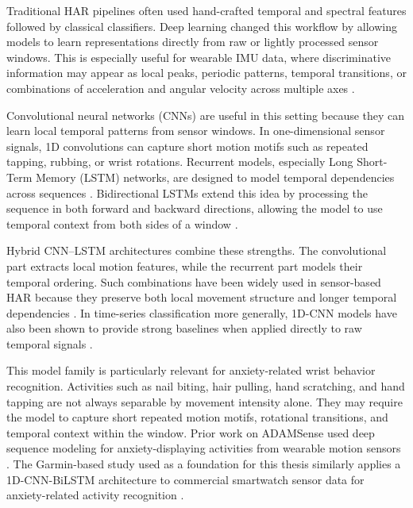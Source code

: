 Traditional HAR pipelines often used hand-crafted temporal and spectral features followed by classical classifiers. Deep learning changed this workflow by allowing models to learn representations directly from raw or lightly processed sensor windows. This is especially useful for wearable IMU data, where discriminative information may appear as local peaks, periodic patterns, temporal transitions, or combinations of acceleration and angular velocity across multiple axes \cite{wang2019sensorhar,zhang2022wearablehar,oleh2024harreview}.

Convolutional neural networks (CNNs) are useful in this setting because they can learn local temporal patterns from sensor windows. In one-dimensional sensor signals, 1D convolutions can capture short motion motifs such as repeated tapping, rubbing, or wrist rotations. Recurrent models, especially Long Short-Term Memory (LSTM) networks, are designed to model temporal dependencies across sequences \cite{hochreiter1997lstm}. Bidirectional LSTMs extend this idea by processing the sequence in both forward and backward directions, allowing the model to use temporal context from both sides of a window \cite{schuster1997bilstm}.

Hybrid CNN--LSTM architectures combine these strengths. The convolutional part extracts local motion features, while the recurrent part models their temporal ordering. Such combinations have been widely used in sensor-based HAR because they preserve both local movement structure and longer temporal dependencies \cite{ordonez2016deep,hammerla2016deep,lyons2021improved}. In time-series classification more generally, 1D-CNN models have also been shown to provide strong baselines when applied directly to raw temporal signals \cite{wang2017timeseries1dcnn}.

This model family is particularly relevant for anxiety-related wrist behavior recognition. Activities such as nail biting, hair pulling, hand scratching, and hand tapping are not always separable by movement intensity alone. They may require the model to capture short repeated motion motifs, rotational transitions, and temporal context within the window. Prior work on ADAMSense used deep sequence modeling for anxiety-displaying activities from wearable motion sensors \cite{khan2021adamsense}. The Garmin-based study used as a foundation for this thesis similarly applies a 1D-CNN-BiLSTM architecture to commercial smartwatch sensor data for anxiety-related activity recognition \cite{oleh2025recognition}.

